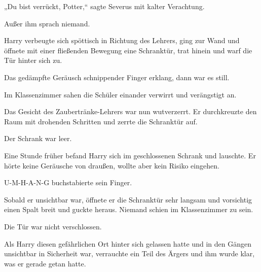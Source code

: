 „Du bist verrückt, Potter,“ sagte Severus mit kalter Verachtung.

Außer ihm sprach niemand.

Harry verbeugte sich spöttisch in Richtung des Lehrers, ging zur Wand und öffnete mit einer fließenden Bewegung eine Schranktür, trat hinein und warf die Tür hinter sich zu.

Das gedämpfte Geräusch schnippender Finger erklang, dann war es still.

Im Klassenzimmer sahen die Schüler einander verwirrt und verängstigt an.

Das Gesicht des Zaubertränke-Lehrers war nun wutverzerrt. Er durchkreuzte den Raum mit drohenden Schritten und zerrte die Schranktür auf.

Der Schrank war leer.

\later

Eine Stunde früher befand Harry sich im geschlossenen Schrank und lauschte. Er hörte keine Geräusche von draußen, wollte aber kein Risiko eingehen.

U-M-H-A-N-G buchstabierte sein Finger.

Sobald er unsichtbar war, öffnete er die Schranktür sehr langsam und vorsichtig einen Spalt breit und guckte heraus. Niemand schien im Klassenzimmer zu sein.

Die Tür war nicht verschlossen.

Als Harry diesen gefährlichen Ort hinter sich gelassen hatte und in den Gängen unsichtbar in Sicherheit war, verrauchte ein Teil des Ärgers und ihm wurde klar, was er gerade getan hatte.

